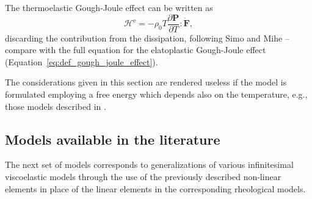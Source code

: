 The thermoelastic Gough-Joule effect can be written as
\begin{equation}
	\mathcal H^\text{e} = -\rho_0T\frac{\partial \mathbf P}{\partial T}:\dot{\mathbf F},
\end{equation}
discarding the contribution from the dissipation, following Simo and Mihe \citep{simoAssociativeCoupledThermoplasticity1992}--compare with the full equation for the elatoplastic Gough-Joule effect (Equation~\eqref{eq:def_gough_joule_effect}).

The considerations given in this section are rendered useless if the model is formulated employing a free energy which depends also on the temperature, e.g., those models described in  \citep{anandThermomechanicallyCoupledTheory2009, amesThermomechanicallyCoupledTheory2009}.

\subsection{Models available in the literature}
\label{sec:rheo_models}


The next set of models corresponds to generalizations of various infinitesimal viscoelastic models through the use of the previously described non-linear elements in place of the linear elements in the corresponding rheological models.

